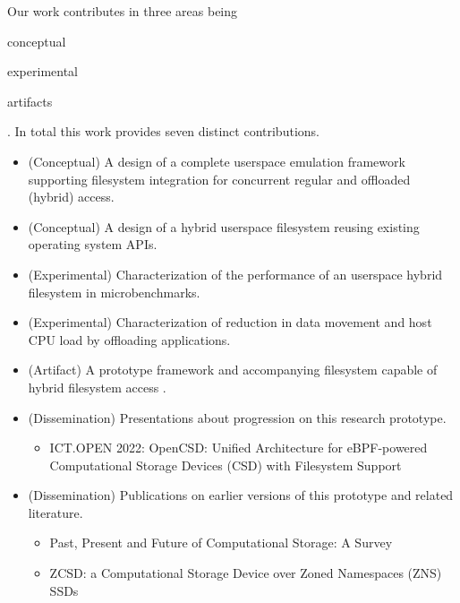 Our work contributes in three areas being \begin{enumerate*} \item conceptual
\item experimental \item artifacts \end{enumerate*}. In total this work
provides seven distinct contributions.

\begin{itemize}
    \item (Conceptual) A design of a complete userspace emulation framework
    supporting filesystem integration for concurrent regular and offloaded
    (hybrid) access.
    \item (Conceptual) A design of a hybrid userspace filesystem reusing
    existing operating system APIs.
    \item (Experimental) Characterization of the performance of an userspace
    hybrid filesystem in microbenchmarks.
    \item (Experimental) Characterization of reduction in data movement and host
    CPU load by offloading applications.
    \item (Artifact) A prototype framework and accompanying filesystem capable
    of hybrid filesystem access \cite{qemu-csd}.
    \item (Dissemination) Presentations about progression on this research
        prototype.
        \begin{itemize}
            \item ICT.OPEN 2022: OpenCSD: Unified Architecture for eBPF-powered
                  Computational Storage Devices (CSD) with Filesystem Support
                  \cite{lukken2022ictopen}
        \end{itemize}
    \item (Dissemination) Publications on earlier versions of this prototype and
        related literature.
        \begin{itemize}
            \item Past, Present and Future of Computational Storage: A Survey \cite{lukken2021past}
            \item ZCSD: a Computational Storage Device over Zoned Namespaces (ZNS) SSDs \cite{lukken2021zcsd}
        \end{itemize}
\end{itemize}